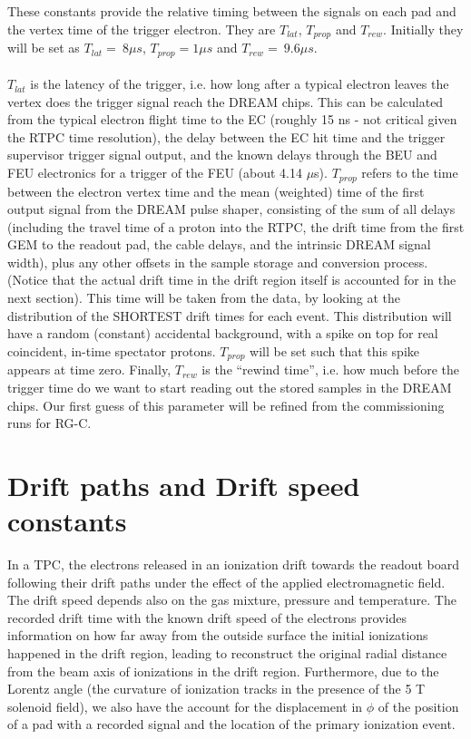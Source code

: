 \documentclass[12pt]{article}
\begin{document}
	These constants provide the relative timing between the signals on each pad
	and the vertex time of the trigger electron. They are
   $T_{lat}$, $T_{prop}$ and $T_{rew}$. Initially they will be set as $T_{lat}=~8\mu s$, $T_{prop} = 1 \mu s$ and 
   $T_{rew}=~9.6\mu s$.
~\\
~\\
$T_{lat}$ is the latency of the trigger, i.e. how long after a typical electron 
leaves the vertex does the trigger signal 
reach the DREAM chips. This can be calculated from the typical electron flight time to the EC
(roughly 15 ns - not critical given the RTPC time resolution), the delay between the EC hit time
and the trigger supervisor trigger signal output, and the known delays through the BEU and FEU
electronics for a trigger of the FEU (about 4.14 $\mu$s).
$T_{prop}$ refers to the time between the electron vertex time and the mean (weighted) time of the first output signal from the DREAM pulse shaper, consisting of the sum of all delays (including the
travel time of a proton into the RTPC, 
the drift time from the first GEM to the readout pad, the cable delays, and the intrinsic DREAM signal width), plus any other offsets
in the sample storage and conversion process. (Notice that the actual drift time in the drift region
itself is accounted for in the next section).
This time will be taken from the data, by looking at the
distribution of the SHORTEST drift times for each event. This distribution will have a random (constant) accidental
background, with a spike on top for real coincident, in-time spectator protons. $T_{prop}$ will be set such
that this spike appears at time zero.
Finally, $T_{rew}$ is the ``rewind time'', i.e. how much before the trigger time do we 
want to start reading out the stored samples in the DREAM chips. Our first 
guess of this parameter will be refined from the commissioning runs for RG-C. 
   
  
   \section{Drift paths and Drift speed constants}
    In a TPC, the electrons released in an ionization drift towards the readout 
  board following their drift paths under the effect of the applied 
  electromagnetic field. The drift speed depends also on the gas mixture, pressure and
  temperature. The 
  recorded drift time with the known drift speed of the electrons provides 
  information on how far away from the outside surface the initial ionizations happened in the drift region, 
  leading to reconstruct the original radial distance from the beam axis of ionizations in the drift 
  region. Furthermore, due to the Lorentz angle (the curvature of ionization tracks in the
  presence of the 5 T solenoid field), we also have the account for the displacement in $\phi$ 
  of the position of a pad with a recorded signal and the location of the primary ionization event.
  
\end{document}
